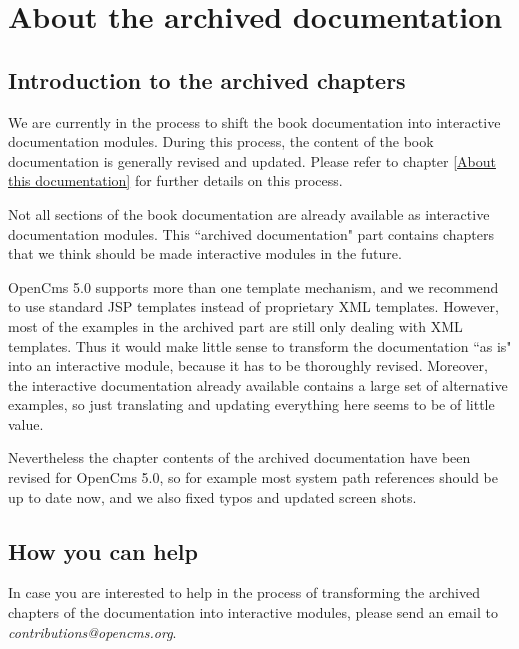 \chapter{About the archived documentation}
\label{About the archived documentation}

\section{Introduction to the archived chapters}

We are currently in the process to shift the book documentation
into interactive documentation modules. During this process, the
content of the book documentation is generally revised and updated.
Please refer to chapter \ref{About this documentation} for further details on this process.

Not all sections of the book documentation are already available
as interactive documentation modules.
This ``archived documentation" part contains chapters that
we think should be made interactive modules in the future. 

OpenCms 5.0 supports more than one template mechanism, and we 
recommend to use standard JSP templates instead of proprietary XML templates. 
However, most of the examples in the archived part are still only 
dealing with XML templates. 
Thus it would make little sense
to transform the documentation ``as is" into an interactive module,
because it has to be thoroughly revised. 
Moreover, the interactive documentation already available 
contains a large set of alternative examples,
so just translating and updating everything here seems to be of little value.

Nevertheless the chapter contents of the archived documentation
have been revised for OpenCms 5.0,
so for example most system path references should be up to date now,
and we also fixed typos and updated screen shots.

\section{How you can help}

In case you are interested to help in the process of transforming the 
archived chapters of the documentation into interactive modules, 
please send an email to {\em contributions@opencms.org}.